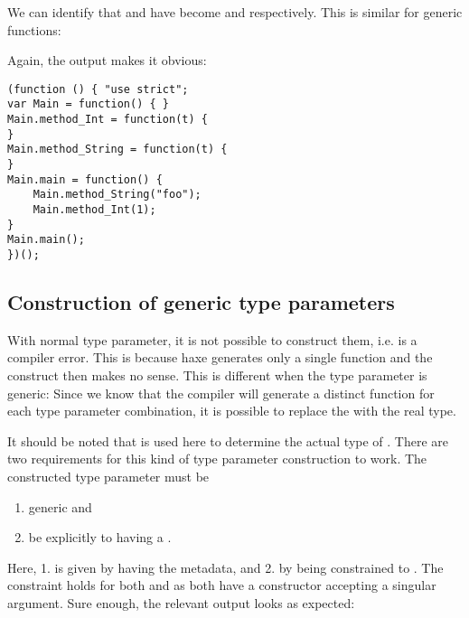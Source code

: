 \documentclass{haxe}
\begin{document}
We can identify that  and  have become  and  respectively. This is similar for generic functions:


Again, the  output makes it obvious:

\begin{lstlisting}
(function () { "use strict";
var Main = function() { }
Main.method_Int = function(t) {
}
Main.method_String = function(t) {
}
Main.main = function() {
	Main.method_String("foo");
	Main.method_Int(1);
}
Main.main();
})();
\end{lstlisting}


\subsection{Construction of generic type parameters}
\label{type-system-generic-type-parameter-construction}


With normal type parameter, it is not possible to construct them, i.e.  is a compiler error. This is because haxe generates only a single function and the construct then makes no sense. This is different when the type parameter is generic: Since we know that the compiler will generate a distinct function for each type parameter combination, it is possible to replace the   with the real type.


It should be noted that  is used here to determine the actual type of . There are two requirements for this kind of type parameter construction to work. The constructed type parameter must be

\begin{enumerate}
	\item generic and
	\item be explicitly  to having a .
\end{enumerate}

Here, 1. is given by  having the  metadata, and 2. by  being constrained to . The constraint holds for both  and  as both have a constructor accepting a singular  argument. Sure enough, the relevant  output looks as expected:
\end{document}
